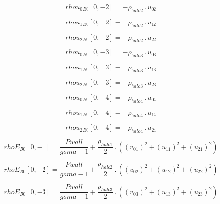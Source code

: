 \documentclass{article}
\begin{document}
\begin{dmath}{rhou_{0}{_{B0}}}[{0,-2}] = - \rho_{halo 2} \,.\, u_{02}\end{dmath}

\begin{dmath}{rhou_{1}{_{B0}}}[{0,-2}] = - \rho_{halo 2} \,.\, u_{12}\end{dmath}

\begin{dmath}{rhou_{2}{_{B0}}}[{0,-2}] = - \rho_{halo 2} \,.\, u_{22}\end{dmath}

\begin{dmath}{rhou_{0}{_{B0}}}[{0,-3}] = - \rho_{halo 3} \,.\, u_{03}\end{dmath}

\begin{dmath}{rhou_{1}{_{B0}}}[{0,-3}] = - \rho_{halo 3} \,.\, u_{13}\end{dmath}

\begin{dmath}{rhou_{2}{_{B0}}}[{0,-3}] = - \rho_{halo 3} \,.\, u_{23}\end{dmath}

\begin{dmath}{rhou_{0}{_{B0}}}[{0,-4}] = - \rho_{halo 4} \,.\, u_{04}\end{dmath}

\begin{dmath}{rhou_{1}{_{B0}}}[{0,-4}] = - \rho_{halo 4} \,.\, u_{14}\end{dmath}

\begin{dmath}{rhou_{2}{_{B0}}}[{0,-4}] = - \rho_{halo 4} \,.\, u_{24}\end{dmath}

\begin{dmath}{rhoE{_{B0}}}[{0,-1}] = \frac{Pwall}{gama - 1} + \frac{\rho_{halo 1}}{2} \,.\, \left(\left(u_{01} \right)^{2} + \left(u_{11} \right)^{2} + \left(u_{21} \right)^{2}\right)\end{dmath}

\begin{dmath}{rhoE{_{B0}}}[{0,-2}] = \frac{Pwall}{gama - 1} + \frac{\rho_{halo 2}}{2} \,.\, \left(\left(u_{02} \right)^{2} + \left(u_{12} \right)^{2} + \left(u_{22} \right)^{2}\right)\end{dmath}

\begin{dmath}{rhoE{_{B0}}}[{0,-3}] = \frac{Pwall}{gama - 1} + \frac{\rho_{halo 3}}{2} \,.\, \left(\left(u_{03} \right)^{2} + \left(u_{13} \right)^{2} + \left(u_{23} \right)^{2}\right)\end{dmath}
\end{document}
